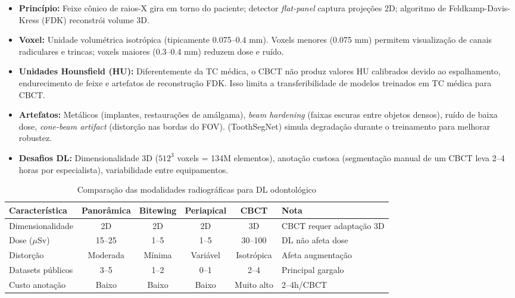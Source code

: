 \begin{itemize}
  \item \textbf{Princípio:} Feixe cônico de raios-X gira em torno do paciente;
        detector \textit{flat-panel} captura projeções 2D; algoritmo de
        Feldkamp-Davis-Kress (FDK) reconstrói volume 3D.
  \item \textbf{Voxel:} Unidade volumétrica isotrópica (tipicamente 0.075--0.4 mm).
        Voxels menores (0.075 mm) permitem visualização de canais radiculares
        e trincas; voxels maiores (0.3--0.4 mm) reduzem dose e ruído.
  \item \textbf{Unidades Hounsfield (HU):} Diferentemente da TC médica, o CBCT
        não produz valores HU calibrados devido ao espalhamento, endurecimento
        de feixe e artefatos de reconstrução FDK. Isso limita a transferibilidade
        de modelos treinados em TC médica para CBCT.
  \item \textbf{Artefatos:} Metálicos (implantes, restaurações de amálgama),
        \textit{beam hardening} (faixas escuras entre objetos densos), ruído
        de baixa dose, \textit{cone-beam artifact} (distorção nas bordas do FOV).
         (ToothSegNet) simula degradação durante o treinamento
        para melhorar robustez.
  \item \textbf{Desafios DL:} Dimensionalidade 3D ($512^3$ voxels = 134M elementos),
        anotação custosa (segmentação manual de um CBCT leva 2--4 horas por
        especialista), variabilidade entre equipamentos.
\end{itemize}

\begin{table}[H]
  \centering
  \caption{Comparação das modalidades radiográficas para DL odontológico}
  \label{tab:modalidades-comp}
  \begin{tabularx}{\textwidth}{lccccX}
    \toprule
    \textbf{Característica} & \textbf{Panorâmica} & \textbf{Bitewing} & \textbf{Periapical} & \textbf{CBCT} & \textbf{Nota} \\
    \midrule
    Dimensionalidade & 2D & 2D & 2D & 3D & CBCT requer adaptação 3D \\
    Dose ($\mu$Sv) & 15--25 & 1--5 & 1--5 & 30--100 & DL não afeta dose \\
    Distorção & Moderada & Mínima & Variável & Isotrópica & Afeta augmentação \\
    Datasets públicos & 3--5 & 1--2 & 0--1 & 2--4 & Principal gargalo \\
    Custo anotação & Baixo & Baixo & Baixo & Muito alto & 2--4h/CBCT \\
    \bottomrule
  \end{tabularx}
\end{table}

